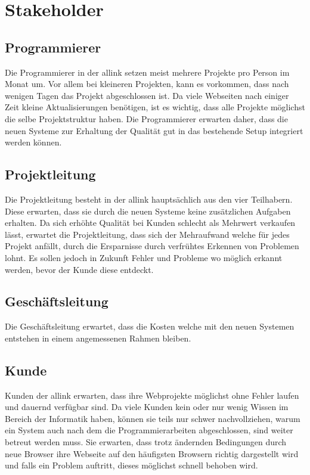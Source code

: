 \section{Stakeholder}
\label{sec:stakeholder}


\subsection{Programmierer}
\label{sub:programmierer}
Die Programmierer in der allink setzen meist mehrere Projekte pro Person im Monat um. Vor allem bei kleineren Projekten, kann es vorkommen, dass nach wenigen Tagen das Projekt abgeschlossen ist. Da viele Webseiten nach einiger Zeit kleine Aktualisierungen benötigen, ist es wichtig, dass alle Projekte möglichst die selbe Projektstruktur haben. Die Programmierer erwarten daher, dass die neuen Systeme zur Erhaltung der Qualität gut in das bestehende Setup integriert werden können.

\subsection{Projektleitung}
\label{sub:projektleitung}
Die Projektleitung besteht in der allink hauptsächlich aus den vier Teilhabern. Diese erwarten, dass sie durch die neuen Systeme keine zusätzlichen Aufgaben erhalten. Da sich erhöhte Qualität bei Kunden schlecht als Mehrwert verkaufen lässt, erwartet die Projektleitung, dass sich der Mehraufwand welche für jedes Projekt anfällt, durch die Ersparnisse durch verfrühtes Erkennen von Problemen lohnt. Es sollen jedoch in Zukunft Fehler und Probleme wo möglich erkannt werden, bevor der Kunde diese entdeckt.

\subsection{Geschäftsleitung}
\label{sub:geschäftsleitung}
Die Geschäftsleitung erwartet, dass die Kosten welche mit den neuen Systemen entstehen in einem angemessenen Rahmen bleiben.

\subsection{Kunde}
\label{sub:kunde}
Kunden der allink erwarten, dass ihre Webprojekte möglichst ohne Fehler laufen und dauernd verfügbar sind. Da viele Kunden kein oder nur wenig Wissen im Bereich der Informatik haben, können sie teils nur schwer nachvollziehen, warum ein System auch nach dem die Programmierarbeiten abgeschlossen, sind weiter betreut werden muss. Sie erwarten, dass trotz ändernden Bedingungen durch neue Browser ihre Webseite auf den häufigsten Browsern richtig dargestellt wird und falls ein Problem auftritt, dieses möglichst schnell behoben wird.


